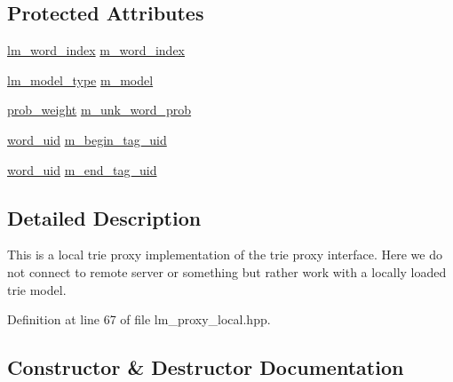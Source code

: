 \subsection*{Protected Attributes}
\begin{DoxyCompactItemize}
\item 
\hyperlink{namespaceuva_1_1smt_1_1bpbd_1_1server_1_1lm_a023e38a6fe02511f8c3c806784c2a5f2}{lm\+\_\+word\+\_\+index} \hyperlink{classuva_1_1smt_1_1bpbd_1_1server_1_1lm_1_1proxy_1_1lm__proxy__local_a52e51098548cbedd08af9b5b6fc897c8}{m\+\_\+word\+\_\+index}
\item 
\hyperlink{namespaceuva_1_1smt_1_1bpbd_1_1server_1_1lm_aca89ac213c9f12240dbf6ac0953bd75f}{lm\+\_\+model\+\_\+type} \hyperlink{classuva_1_1smt_1_1bpbd_1_1server_1_1lm_1_1proxy_1_1lm__proxy__local_ac9984821921672cd3ee113005d5412dd}{m\+\_\+model}
\item 
\hyperlink{namespaceuva_1_1smt_1_1bpbd_1_1server_a01e9ea4de9c226f4464862e84ff0bbcc}{prob\+\_\+weight} \hyperlink{classuva_1_1smt_1_1bpbd_1_1server_1_1lm_1_1proxy_1_1lm__proxy__local_a429b9054d6edfc673d541cb957b52690}{m\+\_\+unk\+\_\+word\+\_\+prob}
\item 
\hyperlink{namespaceuva_1_1smt_1_1bpbd_1_1server_a6bfe45ba344d65a7fdd7d26156328ddc}{word\+\_\+uid} \hyperlink{classuva_1_1smt_1_1bpbd_1_1server_1_1lm_1_1proxy_1_1lm__proxy__local_adf9f94e10e1d210e35c7716b08b89977}{m\+\_\+begin\+\_\+tag\+\_\+uid}
\item 
\hyperlink{namespaceuva_1_1smt_1_1bpbd_1_1server_a6bfe45ba344d65a7fdd7d26156328ddc}{word\+\_\+uid} \hyperlink{classuva_1_1smt_1_1bpbd_1_1server_1_1lm_1_1proxy_1_1lm__proxy__local_a656493c20699367286febb880cbf1ca1}{m\+\_\+end\+\_\+tag\+\_\+uid}
\end{DoxyCompactItemize}


\subsection{Detailed Description}
This is a local trie proxy implementation of the trie proxy interface. Here we do not connect to remote server or something but rather work with a locally loaded trie model. 

Definition at line 67 of file lm\+\_\+proxy\+\_\+local.\+hpp.



\subsection{Constructor \& Destructor Documentation}
\hypertarget{classuva_1_1smt_1_1bpbd_1_1server_1_1lm_1_1proxy_1_1lm__proxy__local_a1aa62dbdb57c77b3014169b4b9c5c215}{}
